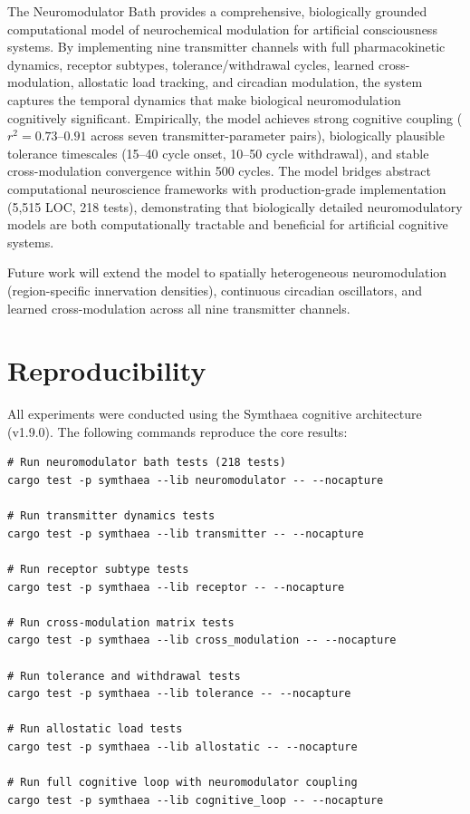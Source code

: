 \documentclass[11pt,a4paper]{article}
\begin{document}
The Neuromodulator Bath provides a comprehensive, biologically grounded computational model of neurochemical modulation for artificial consciousness systems. By implementing nine transmitter channels with full pharmacokinetic dynamics, receptor subtypes, tolerance/withdrawal cycles, learned cross-modulation, allostatic load tracking, and circadian modulation, the system captures the temporal dynamics that make biological neuromodulation cognitively significant. Empirically, the model achieves strong cognitive coupling ($r^2 = 0.73$--$0.91$ across seven transmitter-parameter pairs), biologically plausible tolerance timescales (15--40 cycle onset, 10--50 cycle withdrawal), and stable cross-modulation convergence within 500 cycles. The model bridges abstract computational neuroscience frameworks with production-grade implementation (5,515 LOC, 218 tests), demonstrating that biologically detailed neuromodulatory models are both computationally tractable and beneficial for artificial cognitive systems.

Future work will extend the model to spatially heterogeneous neuromodulation (region-specific innervation densities), continuous circadian oscillators, and learned cross-modulation across all nine transmitter channels.

\section{Reproducibility}

All experiments were conducted using the Symthaea cognitive architecture (v1.9.0). The following commands reproduce the core results:

\begin{verbatim}
# Run neuromodulator bath tests (218 tests)
cargo test -p symthaea --lib neuromodulator -- --nocapture

# Run transmitter dynamics tests
cargo test -p symthaea --lib transmitter -- --nocapture

# Run receptor subtype tests
cargo test -p symthaea --lib receptor -- --nocapture

# Run cross-modulation matrix tests
cargo test -p symthaea --lib cross_modulation -- --nocapture

# Run tolerance and withdrawal tests
cargo test -p symthaea --lib tolerance -- --nocapture

# Run allostatic load tests
cargo test -p symthaea --lib allostatic -- --nocapture

# Run full cognitive loop with neuromodulator coupling
cargo test -p symthaea --lib cognitive_loop -- --nocapture
\end{verbatim}
\end{document}
